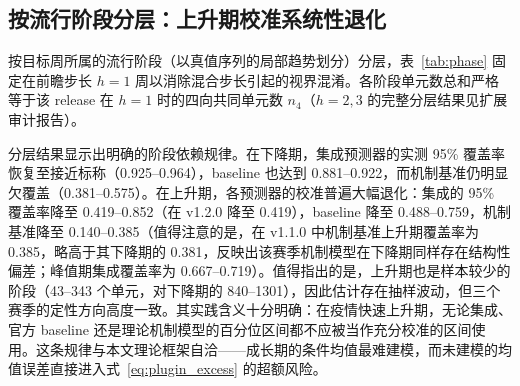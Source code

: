 \documentclass[11pt,a4paper]{article}
\begin{document}
\subsection{按流行阶段分层：上升期校准系统性退化}

按目标周所属的流行阶段（以真值序列的局部趋势划分）分层，表~\ref{tab:phase} 固定在前瞻步长 $h=1$ 周以消除混合步长引起的视界混淆。各阶段单元数总和严格等于该 release 在 $h=1$ 时的四向共同单元数 $n_4$（$h=2, 3$ 的完整分层结果见扩展审计报告）。

\begin{table}[htbp]
\centering\small
\caption{按流行阶段分层的 WIS 与 95\% 覆盖率（$h=1$ 周前瞻；括号内为 cov95）}\label{tab:phase}
\end{table}

分层结果显示出明确的阶段依赖规律。在下降期，集成预测器的实测 95\% 覆盖率恢复至接近标称（0.925--0.964），baseline 也达到 0.881--0.922，而机制基准仍明显欠覆盖（0.381--0.575）。在上升期，各预测器的校准普遍大幅退化：集成的 95\% 覆盖率降至 0.419--0.852（在 v1.2.0 降至 0.419），baseline 降至 0.488--0.759，机制基准降至 0.140--0.385（值得注意的是，在 v1.1.0 中机制基准上升期覆盖率为 0.385，略高于其下降期的 0.381，反映出该赛季机制模型在下降期同样存在结构性偏差；峰值期集成覆盖率为 0.667--0.719）。值得指出的是，上升期也是样本较少的阶段（43--343 个单元，对下降期的 840--1301），因此估计存在抽样波动，但三个赛季的定性方向高度一致。其实践含义十分明确：在疫情快速上升期，无论集成、官方 baseline 还是理论机制模型的百分位区间都不应被当作充分校准的区间使用。这条规律与本文理论框架自洽——成长期的条件均值最难建模，而未建模的均值误差直接进入式~\eqref{eq:plugin_excess} 的超额风险。
\end{document}
